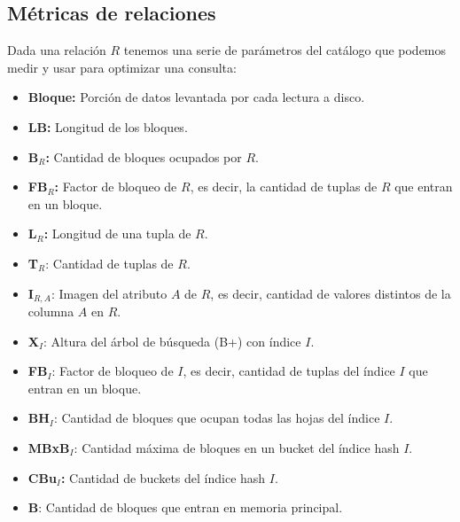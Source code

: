 \subsection*{Métricas de relaciones}
Dada una relación $R$ tenemos una serie de parámetros del catálogo que podemos medir y usar para optimizar una consulta:
\begin{itemize}
    \item \textbf{Bloque:} Porción de datos levantada por cada lectura a disco.
    \item \textbf{LB:} Longitud de los bloques.
    \item \textbf{B$_R$:} Cantidad de bloques ocupados por $R$.
    \item \textbf{FB$_R$:} Factor de bloqueo de $R$, es decir, la cantidad de tuplas de $R$ que entran en un bloque.
    \item \textbf{L$_R$:} Longitud de una tupla de $R$.
    \item \textbf{T$_R$}: Cantidad de tuplas de $R$.
    \item \textbf{I$_{R,A}$}: Imagen del atributo $A$ de $R$, es decir, cantidad de valores distintos de la columna $A$ en $R$.
    \item \textbf{X$_I$}: Altura del árbol de búsqueda (B+) con índice $I$.
    \item \textbf{FB$_I$}: Factor de bloqueo de $I$, es decir, cantidad de tuplas del índice $I$ que entran en un bloque.
    \item \textbf{BH$_I$}: Cantidad de bloques que ocupan todas las hojas del índice $I$.
    \item \textbf{MBxB$_I$}: Cantidad máxima de bloques en un bucket del índice hash $I$.
    \item \textbf{CBu$_I$:} Cantidad de buckets del índice hash $I$.
    \item \textbf{B}: Cantidad de bloques que entran en memoria principal.
\end{itemize}

